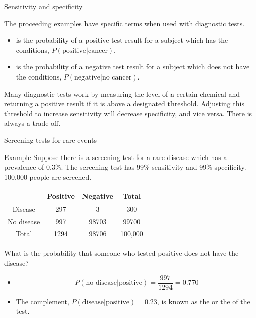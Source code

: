 \documentclass[xcolor=table, handout]{beamer}
\begin{document}
\begin{frame}{Sensitivity and specificity}
\begin{block}{}
The proceeding examples have specific terms when used with diagnostic tests.
\begin{itemize}
\pause
\item {} is the probability of a positive test result for a subject which has the conditions, $P(\text{positive}|\text{cancer})$.
\pause
\item {} is the probability of a negative test result for a subject which does not have the conditions, $P(\text{negative}|\text{no cancer})$.
\end{itemize}

\pause
Many diagnostic tests work by measuring the level of a certain chemical and returning a positive result if it is above a designated threshold. Adjusting this threshold to increase sensitivity will decrease specificity, and vice versa. There is always a trade-off.
\end{block}
\end{frame}

\begin{frame}{Screening tests for rare events}
\begin{exampleblock}{Example}
Suppose there is a screening test for a rare disease which has a prevalence of 0.3\%. The screening test has 99\% sensitivity and 99\% specificity. 100,000 people are screened.\\
\smallskip
{\centering \renewcommand{\arraystretch}{1}
\begin{tabular}{c | c  c | c}
 & Positive & Negative & Total \\
\hline
Disease & 297 & 3 & 300\\
No disease & 997 & 98703 & 99700\\
\hline
Total & 1294 & 98706 & 100,000 
\end{tabular}\par
\renewcommand{\arraystretch}{1.5}
}
\smallskip
What is the probability that someone who tested positive does not have the disease?
\begin{itemize}
\pause
\item \[P(\text{no disease} | \text{positive}) = \frac {997}{1294} = 0.770\]
\vspace*{-\baselineskip}\pause
\item The complement, $P(\text{disease} | \text{positive}) = 0.23$, is known as the  or the  of the test.
\end{itemize}

\end{exampleblock}
\end{frame}
\end{document}
